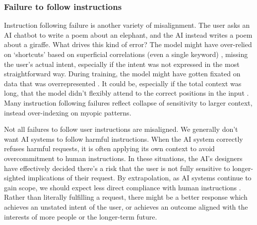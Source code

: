 \documentclass[12pt]{article}
\begin{document}


\subsubsection{Failure to follow instructions}


Instruction following failure is another variety of misalignment. The user asks an AI chatbot to write a poem about an elephant, and the AI instead writes a poem about a giraffe. What drives this kind of error? The model might have over-relied on `shortcuts' based on superficial correlations (even a single keyword) \citep{geirhos2020shortcut}, missing the user's actual intent, especially if the intent was not expressed in the most straightforward way. During training, the model might have gotten fixated on data that was overrepresented \citep{zhao2021calibrate,reynolds2021prompt,xu2024knowledge}. It could be, especially if the total context was long, that the model didn't flexibly attend to the correct positions in the input \citep{liu2024lost}. Many instruction following failures reflect collapse of sensitivity to larger context, instead over-indexing on myopic patterns.

Not all failures to follow user instructions are misaligned. We generally don't want AI systems to follow harmful instructions. When the AI system correctly refuses harmful requests, it is often applying its own context to avoid overcommitment to human instructions. In these situations, the AI's designers have effectively decided there's a risk that the user is not fully sensitive to longer-sighted implications of their request. By extrapolation, as AI systems continue to gain scope, we should expect less direct compliance with human instructions \citep{hadfieldmenell2016cooperative,bostrom2014superintelligence,russell2019human, milli2017should, yudkowsky2004coherent}. Rather than literally fulfilling a request, there might be a better response which achieves an unstated intent of the user, or achieves an outcome aligned with the interests of more people or the longer-term future.
\end{document}
